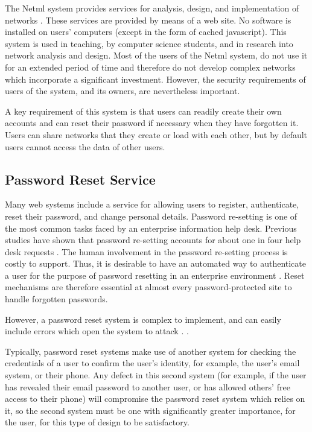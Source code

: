 The Netml system provides services for analysis, design, and implementation
of networks \cite{addie2011netml}. These services are provided by means of a web
site. No software is installed on users' computers (except in the form
of cached javascript). This system is used in teaching, by
computer science students, and in research into network analysis and design. 
\iflonger
Most of the users of the Netml system, do not use it for an extended period of
time and therefore do not develop complex networks which incorporate a significant
investment. However, the security requirements of users of the system, and
its owners, are nevertheless important.
\fi

A key requirement of this system is that users can readily create their own
accounts and can reset their password if necessary when they have forgotten it.
Users can share networks that they create or load with each other, but by default
users cannot access the data of other users.

\subsection{Password Reset Service}
Many web systems include a service for allowing users to register,
authenticate, reset their password, and change personal details.
Password re-setting is one of the most common tasks faced by an
enterprise information help desk. Previous studies have shown that password
re-setting accounts for about one in four help desk requests \cite{bailey2014statistics}. The
human involvement in the password re-setting process is costly to
support. Thus, it is desirable to have an automated way to
authenticate a user for the purpose of password resetting in an
enterprise environment \cite{nimmy2014novel}. Reset mechanisms are therefore
essential at almost every password-protected site to handle forgotten
passwords. 

However, a password reset system is
complex to implement, and can easily include errors which open the system to attack
\iflonger
\cite{routh2018attacks,florencio2014administrator}. 
\else
\cite{routh2018attacks}. 
\fi

Typically, password reset systems make use of another system for checking
the credentials of a user to confirm the user's identity, for example,
the user's email system, or their phone. Any defect
in this second system (for example, if the user has revealed their email password
to another user, or has allowed others' free access to their phone) will compromise the password reset system
which relies on it, so the second system must be one with significantly
greater importance, for the user, for this type of design to be
satisfactory.

